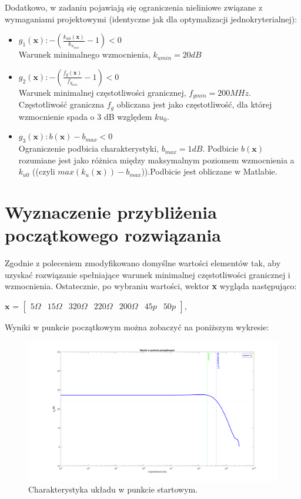 \documentclass{article}
\begin{document}
Dodatkowo, w zadaniu pojawiają się ograniczenia nieliniowe związane z wymaganiami projektowymi (identyczne jak dla optymalizacji jednokryterialnej):\\
\begin{itemize}
	\item \(g_1(\textbf{x}): -(\frac{k_{u0}(\textbf{x})}{k_{u_{min}}}-1) <  0\) \\ Warunek minimalnego wzmocnienia, $k_{umin}=20dB$
	\item \(g_2(\textbf{x}): -(\frac{{f_g}(\textbf{x})}{f_{g_{min}}}-1)<0\) \\ Warunek minimalnej częstotliwości granicznej, $f_{gmin}=200 MHz$. Częstotliwość graniczna $f_g$ obliczana jest jako częstotliwość,
dla której wzmocnienie spada o 3 dB względem $ku_0$.
	\item \(g_3(\textbf{x}): b(\textbf{x})-b_{max}<0\) \\ Ograniczenie podbicia charakterystyki, $b_{max}=1dB$. Podbicie $b(\textbf{x})$ rozumiane jest jako różnica między maksymalnym poziomem wzmocnienia a $k_{u0}$ ((czyli $max(k_{u}(\textbf{x}))-b_{max}$)).Podbicie jest obliczane w Matlabie.

\end{itemize}




\section{Wyznaczenie przybliżenia początkowego rozwiązania}
Zgodnie z poleceniem zmodyfikowano domyślne wartości elementów tak, aby uzyskać rozwiązanie spełniające warunek minimalnej częstotliwości granicznej i wzmocnienia.
Ostatecznie, po wybraniu wartości, wektor \textbf{x} wygląda następująco:
\begin{center}
	$\textbf{x}$ =
	$\begin{bmatrix}
			5\Omega & 15\Omega & 320\Omega & 220\Omega & 200\Omega & 45p & 50p
		\end{bmatrix}$,
\end{center}

Wyniki w punkcie początkowym można zobaczyć na poniższym wykresie:

\begin{figure}[h]
	\includegraphics[width=12cm]{graphics/starting_point.png}
	\centering
	\caption{Charakterystyka układu w punkcie startowym.}
\end{figure}
\end{document}
